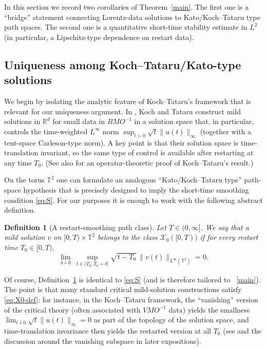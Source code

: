 \documentclass[12pt]{article}
\newcommand{\R}{\mathbb{R}}
\newcommand{\T}{\mathbb{T}}
\newtheorem{definition}[theorem]{Definition}
\theoremstyle{remark}
\theoremstyle{remark}
\begin{document}
In this section we record two corollaries of Theorem~\ref{main}.
The first one is a ``bridge'' statement connecting Lorentz-data solutions to
Kato/Koch--Tataru type path spaces. The second one is a quantitative
short-time stability estimate in $L^2$ (in particular, a Lipschitz-type
dependence on restart data).

\subsection{Uniqueness among Koch--Tataru/Kato-type solutions}

We begin by isolating the analytic feature of Koch--Tataru's framework
that is relevant for our uniqueness argument. In \cite{KochTataru2001},
Koch and Tataru construct mild solutions in $\R^d$ for small data in
$BMO^{-1}$ in a solution space that, in particular, controls the time-weighted
$L^\infty$ norm $\sup_{t>0}\sqrt{t}\|u(t)\|_\infty$ (together with a tent-space
Carleson-type norm). A key point is that their solution space is
time-translation invariant, so the same type of control is available after
restarting at any time $T_0$. (See also \cite{AuscherFrey1310}
for an operator-theoretic proof of Koch--Tataru's result.)

On the torus $\T^2$ one can formulate an analogous ``Kato/Koch--Tataru type''
path-space hypothesis that is precisely designed to imply the short-time
smoothing condition \eqref{eq:S}. For our purposes it is enough to work with
the following abstract definition.

\begin{definition}[A restart-smoothing path class]\label{def:X0}
Let $T\in(0,\infty]$. We say that a mild solution $v$ on $[0,T)\times\T^2$
belongs to the class $\mathcal{X}_0([0,T))$ if for every restart time $T_0\in[0,T)$,
\begin{equation}\label{eq:X0-def}
\lim_{\delta\downarrow 0}\ \sup_{t\in(T_0,T_0+\delta]}\sqrt{t-T_0}\,\|v(t)\|_{L^\infty(\T^2)}=0.
\end{equation}
\end{definition}

Of course, Definition~\ref{def:X0} is identical to \eqref{eq:S} (and is therefore
tailored to ~\ref{main}). The point is that many
standard critical mild-solution constructions satisfy \eqref{eq:X0-def}:
for instance, in the Koch--Tataru framework, the ``vanishing'' version of the
critical theory (often associated with $VMO^{-1}$ data) yields the smallness
$\lim_{t\downarrow 0}\sqrt{t}\|u(t)\|_\infty=0$ as part of the topology of the solution
space, and time-translation invariance then yields the restarted version at all $T_0$
(see \cite{KochTataru2001} and the discussion around the vanishing subspace in later
expositions).
\end{document}

